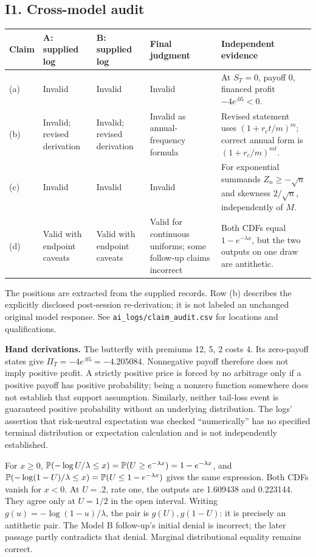 \subsection{I1. Cross-model audit}
\begin{center}\small\setlength{\tabcolsep}{4pt}
\begin{tabular}{p{.08\linewidth}p{.16\linewidth}p{.16\linewidth}p{.16\linewidth}p{.33\linewidth}}
\toprule Claim & A: supplied log & B: supplied log & Final judgment & Independent evidence\\\midrule
(a) & Invalid & Invalid & Invalid & At $S_T=0$, payoff 0, financed profit $-4e^{.05}<0$.\\
(b) & Invalid; revised derivation & Invalid; revised derivation & Invalid as annual-frequency formula & Revised statement uses $(1+r_ct/m)^m$; correct annual form is $(1+r_c/m)^{mt}$.\\
(c) & Invalid & Invalid & Invalid & For exponential summands $Z_n\geq-\sqrt n$ and skewness $2/\sqrt n$, independently of $M$.\\
(d) & Valid with endpoint caveats & Valid with endpoint caveats & Valid for continuous uniforms; some follow-up claims incorrect & Both CDFs equal $1-e^{-\lambda x}$, but the two outputs on one draw are antithetic.\\\bottomrule
\end{tabular}\end{center}
The positions are extracted from the supplied records. Row (b) describes the explicitly disclosed post-session re-derivation; it is not labeled an unchanged original model response. See \texttt{ai\_logs/claim\_audit.csv} for locations and qualifications.

\textbf{Hand derivations.} The butterfly with premiums 12, 5, 2 costs 4. Its zero-payoff states give $\Pi_T=-4e^{.05}=-4.205084$. Nonnegative payoff therefore does not imply positive profit. A strictly positive price is forced by no arbitrage only if a positive payoff has positive probability; being a nonzero function somewhere does not establish that support assumption. Similarly, neither tail-loss event is guaranteed positive probability without an underlying distribution. The logs' assertion that risk-neutral expectation was checked ``numerically'' has no specified terminal distribution or expectation calculation and is not independently established.

For $x\geq0$, $\mathbb P(-\log U/\lambda\leq x)=\mathbb P(U\geq e^{-\lambda x})=1-e^{-\lambda x}$, and $\mathbb P(-\log(1-U)/\lambda\leq x)=\mathbb P(U\leq1-e^{-\lambda x})$ gives the same expression. Both CDFs vanish for $x<0$. At $U=.2$, rate one, the outputs are 1.609438 and 0.223144. They agree only at $U=1/2$ in the open interval. Writing $g(u)=-\log(1-u)/\lambda$, the pair is $g(U),g(1-U)$: it is precisely an antithetic pair. The Model B follow-up's initial denial is incorrect; the later passage partly contradicts that denial. Marginal distributional equality remains correct.

